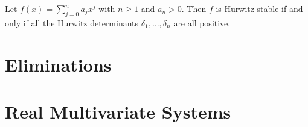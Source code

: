 \documentclass[12pt]{amsart}
\theoremstyle{definition}
\begin{document}
\theorem
Let $f(x) = \sum_{j=0}^{n}a_{j}x^{j}$ with $n\geq 1$ and $a_{n}>0$. Then $f$ is Hurwitz stable if and only if all the Hurwitz determinants $\delta_{1},\dots,\delta_{n}$ are all positive.
%
%

\section{Eliminations}
%


\section{Real Multivariate Systems}
%



%

\end{document}
